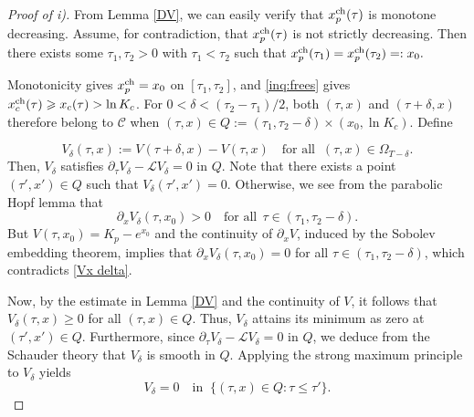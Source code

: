 \documentclass[11pt, a4paper, leqno]{amsart}
\numberwithin{equation}{section}
\theoremstyle{plain}
\theoremstyle{definition}
\theoremstyle{remark}
\def\le{\leqslant}
\def\geq{\geqslant}
\begin{document}
\begin{proof}[Proof of i)]
From Lemma \ref{DV}, we can easily verify that $x_p^{\rm ch}(\tau)$ is monotone decreasing. 
Assume, for contradiction, that $x_p^{\rm ch}(\tau)$ is not strictly decreasing.
Then there exists some $\tau_1,\tau_2>0$ with $\tau_1<\tau_2$ such that $x_p^{\rm ch}(\tau_1)=x_p^{\rm ch}(\tau_2)=:x_0.$

Monotonicity gives $x_p^{\rm ch}=x_0$ on $[\tau_1,\tau_2]$,
and \eqref{inq:frees} gives $x_c^{\rm ch}(\tau)\geq x_c(\tau)>\ln K_c$.
For $0<\delta<(\tau_2-\tau_1)/2$, both $(\tau,x)$ and
$(\tau+\delta,x)$ therefore belong to $\mathcal C$ when
$(\tau,x)\in Q:=(\tau_1,\tau_2-\delta)\times(x_0,\ln K_c)$.
Define

\[V_\delta(\tau,x)
:= V(\tau+\delta,x) - V(\tau,x)
\quad \text{for all }\
(\tau,x)\in \Omega_{T-\delta}.\]
Then, $V_\delta$ satisfies
$\partial_\tau V_\delta - \mathcal{L} V_\delta = 0$ in $Q$.
Note that there exists a point $(\tau',x')\in Q$ such that $V_\delta(\tau',x')=0.$ Otherwise, we see from the parabolic Hopf lemma that
\begin{equation}\label{Vx delta}
    \partial_x V_\delta(\tau,x_0)>0 
    \quad \text{for \ all}\ \ \tau\in(\tau_1,\tau_2-\delta).  
\end{equation}
But $V(\tau,x_0)=K_p-e^{x_0}$ and the continuity of $\partial_x V$, induced by the Sobolev embedding theorem, implies that
$\partial_x V_\delta(\tau,x_0)=0$ for all $\tau\in(\tau_1,\tau_2-\delta)$, which contradicts \eqref{Vx delta}.

Now, by the estimate in Lemma \ref{DV} and the continuity of $V$, it follows that $V_\delta(\tau,x)\geq 0$ for all $(\tau,x)\in Q$. Thus, $V_\delta$ attains its minimum as zero at $(\tau',x')\in Q$.
Furthermore, since $\partial_\tau V_\delta-\mathcal{L}V_\delta=0$ in $Q$, we deduce from the Schauder theory that $V_\delta$ is smooth in $Q$.
Applying the strong maximum principle \cite[Theorem 2.7]{LIE96} to $V_\delta$ yields
\begin{equation}\label{Vdelta}
V_\delta= 0\quad\text{in }\ \{(\tau,x)\in Q: \tau\le \tau'\}.    
\end{equation}


\end{proof}
\end{document}

